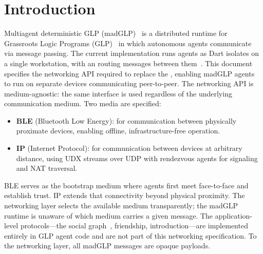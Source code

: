 \section{Introduction}
Multiagent deterministic GLP (madGLP)~\cite{shapiro2026implementing} is a distributed runtime for Grassroots Logic Programs (GLP)~\cite{shapiro2025glp} in which autonomous agents communicate via message passing. The current implementation runs agents as Dart isolates on a single workstation, with an  routing messages between them~\cite{shapiro2026implementing}. This document specifies the networking API required to replace the , enabling madGLP agents to run on separate devices communicating peer-to-peer.
The networking API is medium-agnostic: the same interface is used regardless of the underlying communication medium. Two media are specified:
\begin{itemize}
\item \textbf{BLE} (Bluetooth Low Energy): for communication between physically proximate devices, enabling offline, infrastructure-free operation.
\item \textbf{IP} (Internet Protocol): for communication between devices at arbitrary distance, using UDX streams over UDP with rendezvous agents for signaling and NAT traversal.
\end{itemize}
BLE serves as the bootstrap medium where agents first meet face-to-face and establish trust. IP extends that connectivity beyond physical proximity. The networking layer selects the available medium transparently; the madGLP runtime is unaware of which medium carries a given message.
The application-level protocols---the social graph~\cite{shapiro2025atomic}, friendship, introduction---are implemented entirely in GLP agent code and are not part of this networking specification. To the networking layer, all madGLP messages are opaque payloads.
